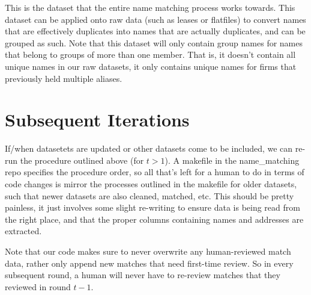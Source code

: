 \documentclass{article}
\begin{document}
This is the dataset that the entire name matching process works towards. This dataset can be applied onto raw data (such as leases or flatfiles) to convert names that are effectively duplicates into names that are actually duplicates, and can be grouped as such. Note that this dataset will only contain group names for names that belong to groups of more than one member. That is, it doesn't contain all unique names in our raw datasets, it only contains unique names for firms that previously held multiple aliases.  

\section{Subsequent Iterations}
If/when datasetets are updated or other datasets come to be included, we can re-run the procedure outlined above (for $t > 1$). A makefile in the name\_matching repo specifies the procedure order, so all that's left for a human to do in terms of code changes is mirror the processes outlined in the makefile for older datasets, such that newer datasets are also cleaned, matched, etc. This should be pretty painless, it just involves some slight re-writing to ensure data is being read from the right place, and that the proper columns containing names and addresses are extracted. 

Note that our code makes sure to never overwrite any human-reviewed match data, rather only append new matches that need first-time review. So in every subsequent round, a human will never have to re-review matches that they reviewed in round $t - 1$.  
\end{document}
